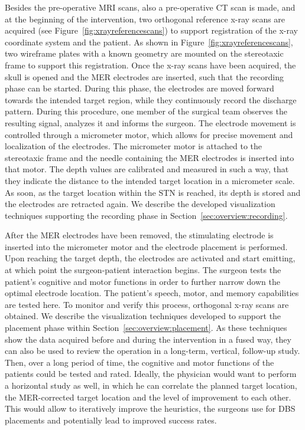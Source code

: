 \documentclass[journal]{vgtc}                %
\begin{document}
Besides the pre-operative MRI scans, also a pre-operative CT scan is made, and at the beginning of the intervention, two orthogonal reference x-ray scans are acquired (see Figure~\ref{fig:xrayreferencescans}) to support registration of the x-ray coordinate system and the patient. As shown in Figure~\ref{fig:xrayreferencescans}, two wireframe plates with a known geometry are mounted on the stereotaxic frame to support this registration. Once the x-ray scans have been acquired, the skull is opened and the MER electrodes are inserted, such that the recording phase can be started. During this phase, the electrodes are moved forward towards the intended target region, while they continuously record the discharge pattern. During this procedure, one member of the surgical team observes the resulting signal, analyzes it and informs the surgeon. The electrode movement is controlled through a micrometer motor, which allows for precise movement and localization of the electrodes. The micrometer motor is attached to the stereotaxic frame and the needle containing the MER electrodes is inserted into that motor. The depth values are calibrated and measured in such a way, that they indicate the distance to the intended target location in a micrometer scale. As soon, as the target location within the STN is reached, its depth is stored and the electrodes are retracted again. We describe the developed visualization techniques supporting the recording phase in Section~\ref{sec:overview:recording}.

After the MER electrodes have been removed, the stimulating electrode is inserted into the micrometer motor and the electrode placement is performed. Upon reaching the target depth, the electrodes are activated and start emitting, at which point the surgeon-patient interaction begins. The surgeon tests the patient's cognitive and motor functions in order to further narrow down the optimal electrode location. The patient's speech, motor, and memory capabilities are tested here. To monitor and verify this process, orthogonal x-ray scans are obtained. We describe the visualization techniques developed to support the placement phase within Section~\ref{sec:overview:placement}. As these techniques show the data acquired before and during the intervention in a fused way, they can also be used to review the operation in a long-term, vertical, follow-up study. Then, over a long period of time, the cognitive and motor functions of the patients could be tested and rated. Ideally, the physician would want to perform a horizontal study as well, in which he can correlate the planned target location, the MER-corrected target location and the level of improvement to each other. This would allow to iteratively improve the heuristics, the surgeons use for DBS placements and potentially lead to improved success rates.
\end{document}
